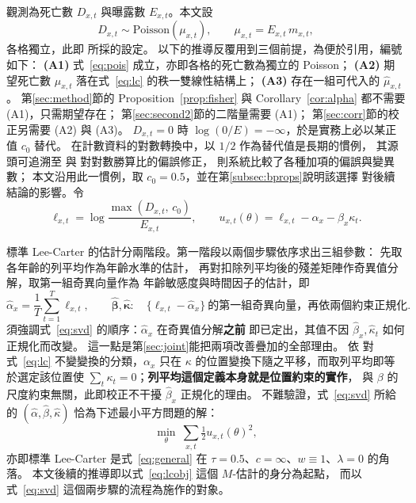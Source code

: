 \documentclass[UTF8, fontset=macnew, a4paper, 12pt]{ctexart}
\begin{document}
觀測為死亡數 $D_{x,t}$ 與曝露數 $E_{x,t}$。本文設
\begin{equation}\label{eq:pois}
D_{x,t}\sim\text{Poisson}(\mu_{x,t}),\qquad \mu_{x,t}=E_{x,t}\,m_{x,t},
\end{equation}
各格獨立，此即 \citet{brouhns2002}所採的設定。
以下的推導反覆用到三個前提，為便於引用，編號如下：
\textbf{(A1)} 式~\eqref{eq:pois} 成立，亦即各格的死亡數為獨立的 Poisson；
\textbf{(A2)} 期望死亡數 $\mu_{x,t}$ 落在式~\eqref{eq:lc} 的秩一雙線性結構上；
\textbf{(A3)} 存在一組可代入的 $\hat\mu_{x,t}$。
第\ref{sec:method}節的 Proposition~\ref{prop:fisher} 與
Corollary~\ref{cor:alpha} 都不需要 (A1)，只需期望存在；
第\ref{sec:second2}節的二階量需要 (A1)；
第\ref{sec:corr}節的校正另需要 (A2) 與 (A3)。
$D_{x,t}=0$ 時 $\log(0/E)=-\infty$，於是實務上必以某正值 $c_0$ 替代。
在計數資料的對數轉換中，以 $1/2$ 作為替代值是長期的慣例，
其源頭可追溯至 \citet{haldane1956}與 \citet{anscombe1956}對對數勝算比的偏誤修正，
\citet{gart1967}則系統比較了各種加項的偏誤與變異數；
本文沿用此一慣例，取 $c_0=0.5$，並在第\ref{subsec:bprops}說明該選擇
對後續結論的影響。令
\begin{equation}\label{eq:ell}
\ell_{x,t}=\log\frac{\max(D_{x,t},\,c_0)}{E_{x,t}},\qquad
u_{x,t}(\theta)=\ell_{x,t}-\alpha_x-\beta_x\kappa_t .
\end{equation}

標準 Lee-Carter 的估計分兩階段。第一階段以兩個步驟依序求出三組參數：
先取各年齡的列平均作為年齡水準的估計，
再對扣除列平均後的殘差矩陣作奇異值分解，取第一組奇異向量作為
年齡敏感度與時間因子的估計，即
\begin{equation}\label{eq:svd}
\hat\alpha_x=\frac1T\sum_{t=1}^{T}\ell_{x,t},\qquad
\hat{\boldsymbol\beta},\hat{\boldsymbol\kappa}:\quad
\{\ell_{x,t}-\hat\alpha_x\}\ \text{的第一組奇異向量，再依兩個約束正規化} .
\end{equation}
須強調式~\eqref{eq:svd} 的順序：$\hat\alpha_x$ 在奇異值分解\textbf{之前}
即已定出，其值不因 $\hat\beta_x,\hat\kappa_t$ 如何正規化而改變。
這一點是第\ref{sec:joint}能把兩項改善疊加的全部理由。
依 \citet{hunt2020} 對式~\eqref{eq:lc} 不變變換的分類，$\alpha_x$ 只在
$\kappa$ 的位置變換下隨之平移，而取列平均即等於選定該位置使
$\sum_t\kappa_t=0$；\textbf{列平均這個定義本身就是位置約束的實作}，
與 $\beta$ 的尺度約束無關，此即校正不干擾 $\hat\beta_x$ 正規化的理由。
不難驗證，式~\eqref{eq:svd} 所給的 $(\hat\alpha,\hat\beta,\hat\kappa)$
恰為下述最小平方問題的解：
\begin{equation}\label{eq:lcobj}
\min_{\theta}\ \sum_{x,t}\tfrac12 u_{x,t}(\theta)^2 ,
\end{equation}
亦即標準 Lee-Carter 是式~\eqref{eq:general} 在
$\tau=0.5$、$c=\infty$、$w\equiv1$、$\lambda=0$ 的角落。
本文後續的推導即以式~\eqref{eq:lcobj} 這個 $M$-估計的身分為起點，
而以式~\eqref{eq:svd} 這個兩步驟的流程為施作的對象。
\end{document}
